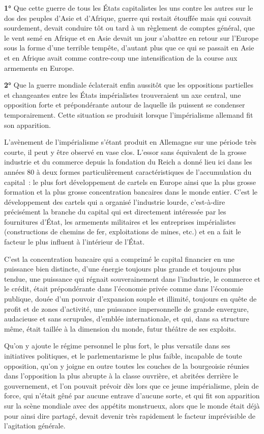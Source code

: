 \documentclass[french,twoside]{book} %
\begin{document}
\textbf{1°} Que cette guerre de tous les États capitalistes les uns contre les autres sur le dos des peuples d’Asie et d’Afrique, guerre qui restait étouffée mais qui couvait sourdement, devait conduire tôt ou tard à un règlement de comptes général, que le vent semé en Afrique et en Asie devait un jour s’abattre en retour sur l’Europe sous la forme d’une terrible tempête, d’autant plus que ce qui se passait en Asie et en Afrique avait comme contre-coup une intensification de la course aux armements en Europe.\par
\textbf{2°} Que la guerre mondiale éclaterait enfin aussitôt que les oppositions partielles et changeantes entre les États impérialistes trouveraient un axe central, une opposition forte et prépondérante autour de laquelle ils puissent se condenser temporairement. Cette situation se produisit lorsque l’impérialisme allemand fit son apparition.\par
L'avènement de l’impérialisme s’étant produit en Allemagne sur une période très courte, il peut y être observé en vase clos. L'essor sans équivalent de la grosse industrie et du commerce depuis la fondation du Reich a donné lieu ici dans les années 80 à deux formes particulièrement caractéristiques de l’accumulation du capital : le plus fort développement de cartels en Europe ainsi que la plus grosse formation et la plus grosse concentration bancaires dans le monde entier. C'est le développement des cartels qui a organisé l’industrie lourde, c’est-à-dire précisément la branche du capital qui est directement intéressée par les fournitures d’État, les armements militaires et les entreprises impérialistes (constructions de chemins de fer, exploitations de mines, etc.) et en a fait le facteur le plus influent à l’intérieur de l’État.\par
C'est la concentration bancaire qui a comprimé le capital financier en une puissance bien distincte, d’une énergie toujours plus grande et toujours plus tendue, une puissance qui régnait souverainement dans l’industrie, le commerce et le crédit, était prépondérante dans l’économie privée comme dans l’économie publique, douée d’un pouvoir d’expansion souple et illimité, toujours en quête de profit et de zones d’activité, une puissance impersonnelle de grande envergure, audacieuse et sans scrupules, d’emblée internationale, et qui, dans sa structure même, était taillée à la dimension du monde, futur théâtre de ses exploits.\par
Qu'on y ajoute le régime personnel le plus fort, le plus versatile dans ses initiatives politiques, et le parlementarisme le plus faible, incapable de toute opposition, qu’on y joigne en outre toutes les couches de la bourgeoisie réunies dans l’opposition la plus abrupte à la classe ouvrière, et abritées derrière le gouvernement, et l’on pouvait prévoir dès lors que ce jeune impérialisme, plein de force, qui n’était gêné par aucune entrave d’aucune sorte, et qui fit son apparition sur la scène mondiale avec des appétits monstrueux, alors que le monde était déjà pour ainsi dire partagé, devait devenir très rapidement le facteur imprévisible de l’agitation générale.\par
\end{document}
